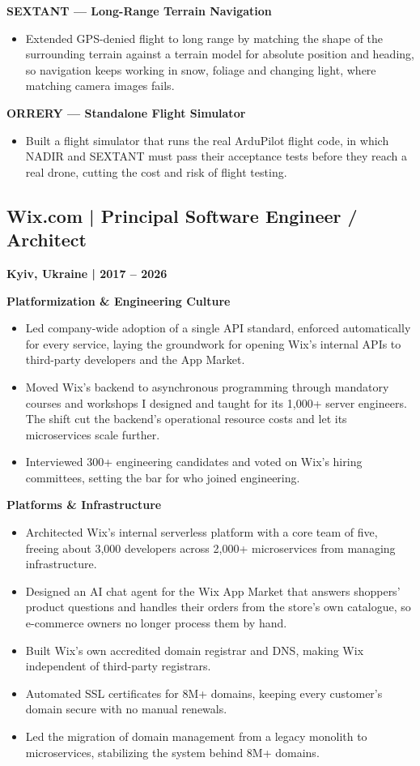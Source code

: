 \documentclass[11pt,a4paper]{article}
\newcommand{\role}[3]{\Needspace*{6\baselineskip}\subsection*{#1 | #2}\textbf{#3}\par}
\newcommand{\project}[1]{\Needspace*{4\baselineskip}\textbf{#1}\par}
\begin{document}
\vspace{0.5em}
\project{SEXTANT --- Long-Range Terrain Navigation}
\begin{itemize}
    \item Extended GPS-denied flight to long range by matching the shape of the surrounding terrain against a terrain model for absolute position and heading, so navigation keeps working in snow, foliage and changing light, where matching camera images fails.
\end{itemize}

\vspace{0.5em}
\project{ORRERY --- Standalone Flight Simulator}
\begin{itemize}
    \item Built a flight simulator that runs the real ArduPilot flight code, in which NADIR and SEXTANT must pass their acceptance tests before they reach a real drone, cutting the cost and risk of flight testing.
\end{itemize}

\vspace{1em}
\role{Wix.com}{Principal Software Engineer / Architect}{Kyiv, Ukraine | 2017 -- 2026}
\project{Platformization \& Engineering Culture}
\begin{itemize}
    \item Led company-wide adoption of a single API standard, enforced automatically for every service, laying the groundwork for opening Wix's internal APIs to third-party developers and the App Market.
    \item Moved Wix's backend to asynchronous programming through mandatory courses and workshops I designed and taught for its 1,000+ server engineers. The shift cut the backend's operational resource costs and let its microservices scale further.
    \item Interviewed 300+ engineering candidates and voted on Wix's hiring committees, setting the bar for who joined engineering.
\end{itemize}

\vspace{0.5em}
\project{Platforms \& Infrastructure}
\begin{itemize}
    \item Architected Wix's internal serverless platform with a core team of five, freeing about 3,000 developers across 2,000+ microservices from managing infrastructure.
    \item Designed an AI chat agent for the Wix App Market that answers shoppers' product questions and handles their orders from the store's own catalogue, so e-commerce owners no longer process them by hand.
    \item Built Wix's own accredited domain registrar and DNS, making Wix independent of third-party registrars.
    \item Automated SSL certificates for 8M+ domains, keeping every customer's domain secure with no manual renewals.
    \item Led the migration of domain management from a legacy monolith to microservices, stabilizing the system behind 8M+ domains.
\end{itemize}
\end{document}
